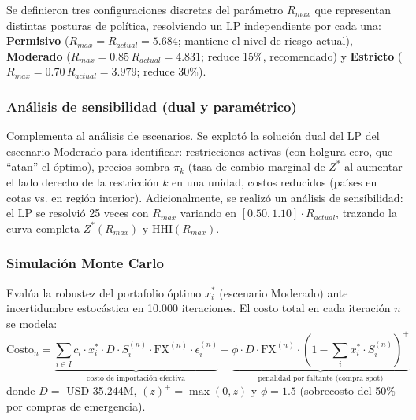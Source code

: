 \documentclass[11pt,a4paper]{article}
\begin{document}
Se definieron tres configuraciones discretas del parámetro $R_{max}$ que representan distintas posturas de política, resolviendo un LP independiente por cada una: \textbf{Permisivo} ($R_{max} = R_{actual} = 5.684$; mantiene el nivel de riesgo actual), \textbf{Moderado} ($R_{max} = 0.85\, R_{actual} = 4.831$; reduce 15\%, recomendado) y \textbf{Estricto} ($R_{max} = 0.70\, R_{actual} = 3.979$; reduce 30\%).

\subsubsection{Análisis de sensibilidad (dual y paramétrico)}

Complementa al análisis de escenarios. Se explotó la solución dual del LP del escenario Moderado para identificar: restricciones activas (con holgura cero, que ``atan'' el óptimo), precios sombra $\pi_k$ (tasa de cambio marginal de $Z^*$ al aumentar el lado derecho de la restricción $k$ en una unidad, costos reducidos (países en cotas vs. en región interior). Adicionalmente, se realizó un análisis de sensibilidad: el LP se resolvió 25 veces con $R_{max}$ variando en $[0.50, 1.10]\cdot R_{actual}$, trazando la curva completa $Z^*(R_{max})$ y HHI$(R_{max})$.

\subsubsection{Simulación Monte Carlo}

Evalúa la robustez del portafolio óptimo $x_i^*$ (escenario Moderado) ante incertidumbre estocástica en 10.000 iteraciones. El costo total en cada iteración $n$ se modela:
\vspace{-0.1cm}
\begin{equation}
\text{Costo}_n = \underbrace{\sum_{i \in I} c_i \cdot x_i^* \cdot D \cdot S_i^{(n)} \cdot \text{FX}^{(n)} \cdot \epsilon_i^{(n)}}_{\text{costo de importación efectiva}} + \underbrace{\phi \cdot D \cdot \text{FX}^{(n)} \cdot \left(1 - \sum_{i} x_i^* \cdot S_i^{(n)}\right)^+}_{\text{penalidad por faltante (compra spot)}}
\label{eq:mc}
\end{equation}
donde $D=$ USD 35.244M, $(z)^+=\max(0,z)$ y $\phi=1.5$ (sobrecosto del 50\% por compras de emergencia).
\end{document}
